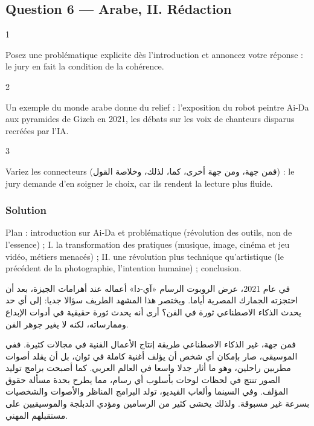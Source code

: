 \documentclass[11pt,a4paper]{article}
\begin{document}
\hypertarget{question-6-arabe-ii.-ruxe9daction}{%
\subsection{Question 6 --- Arabe, II. Rédaction}\label{question-6-arabe-ii.-ruxe9daction}}

\begin{indication}{1}

Posez une problématique explicite dès l'introduction et annoncez votre réponse : le jury en fait la condition de la cohérence.

\end{indication}

\begin{indication}{2}

Un exemple du monde arabe donne du relief : l'exposition du robot peintre Ai-Da aux pyramides de Gizeh en 2021, les débats sur les voix de chanteurs disparus recréées par l'IA.

\end{indication}

\begin{indication}{3}

Variez les connecteurs (فمن جهة، ومن جهة أخرى، كما، لذلك، وخلاصة القول) : le jury demande d'en soigner le choix, car ils rendent la lecture plus fluide.

\end{indication}

\hypertarget{solution-5}{%
\subsubsection{Solution}\label{solution-5}}

Plan : introduction sur Ai-Da et problématique (révolution des outils, non de l'essence) ; I. la transformation des pratiques (musique, image, cinéma et jeu vidéo, métiers menacés) ; II. une révolution plus technique qu'artistique (le précédent de la photographie, l'intention humaine) ; conclusion.

في عام 2021، عرض الروبوت الرسام «آي-دا» أعماله عند أهرامات الجيزة، بعد أن احتجزته الجمارك المصرية أياما. ويختصر هذا المشهد الطريف سؤالا جديا: إلى أي حد يحدث الذكاء الاصطناعي ثورة في الفن؟ أرى أنه يحدث ثورة حقيقية في أدوات الإبداع وممارساته، لكنه لا يغير جوهر الفن.

فمن جهة، غير الذكاء الاصطناعي طريقة إنتاج الأعمال الفنية في مجالات كثيرة. ففي الموسيقى، صار بإمكان أي شخص أن يؤلف أغنية كاملة في ثوان، بل أن يقلد أصوات مطربين راحلين، وهو ما أثار جدلا واسعا في العالم العربي. كما أصبحت برامج توليد الصور تنتج في لحظات لوحات بأسلوب أي رسام، مما يطرح بحدة مسألة حقوق المؤلف. وفي السينما وألعاب الفيديو، تولد البرامج المناظر والأصوات والشخصيات بسرعة غير مسبوقة. ولذلك يخشى كثير من الرسامين ومؤدي الدبلجة والموسيقيين على مستقبلهم المهني.
\end{document}
